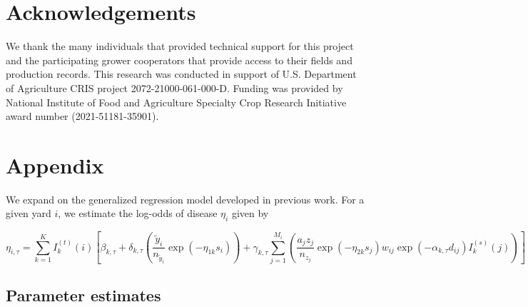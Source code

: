 \documentclass[10pt,a4paper]{article}
\begin{document}
\section*{Acknowledgements}

We thank the many individuals that provided technical support for this project and the participating grower cooperators that provide access to their fields and production records. This research was conducted in support of U.S. Department of Agriculture CRIS project 2072-21000-061-000-D. Funding was provided by National Institute of Food and Agriculture Specialty Crop Research Initiative award number (2021-51181-35901).

\printbibliography

\newpage

\section{Appendix}
\setcounter{table}{0} %
\renewcommand{\thetable}{S\arabic{table}} %

We expand on the generalized regression model developed in previous work. For a given yard $i$, we estimate the log-odds of disease $\eta_{i}$ given by

$$
\eta_{i, \tau}=\sum_{k=1}^{K} I_{k}^{(t)}(i)\left[\beta_{k, \tau}+\delta_{k, \tau}\left(\frac{\tilde{y}_{i}}{n_{\tilde{y}_{i}}} \exp{\left(-\eta_{1k} s_{i}\right)}\right)+\gamma_{k, \tau} \sum_{j=1}^{M_{i}}\left(\frac{a_{j} z_{j}}{n_{z_{j}}} \exp{\left(-\eta_{2k} s_{j}\right)} w_{i j} \exp{\left(-\alpha_{k, \tau} d_{i j}\right)} I_{k}^{(s)}(j)\right)\right]
$$

\subsection{Parameter estimates}
\end{document}
